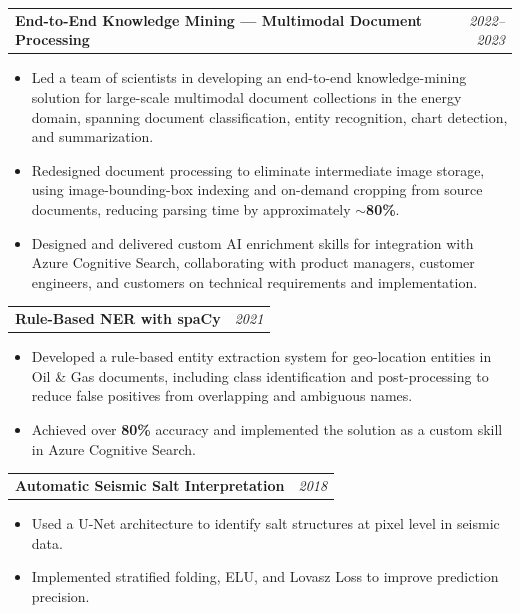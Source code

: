 \documentclass[10pt,letterpaper]{article}
\makeatletter
\newcommand{\heading}[2]{\vspace{2pt}\begin{tabularx}{\textwidth}{@{}Xr@{}}\textbf{#1} & \textit{#2}\end{tabularx}\vspace{-0pt}}
\makeatother
\begin{document}
\heading{End-to-End Knowledge Mining --- Multimodal Document Processing}{2022--2023}
\begin{itemize}
\item Led a team of scientists in developing an end-to-end knowledge-mining solution for large-scale multimodal document collections in the energy domain, spanning document classification, entity recognition, chart detection, and summarization.
\item Redesigned document processing to eliminate intermediate image storage, using image-bounding-box indexing and on-demand cropping from source documents, reducing parsing time by approximately \textbf{$\sim$80\%}.
\item Designed and delivered custom AI enrichment skills for integration with Azure Cognitive Search, collaborating with product managers, customer engineers, and customers on technical requirements and implementation.
\end{itemize}

\heading{Rule-Based NER with spaCy}{2021}
\begin{itemize}
\item Developed a rule-based entity extraction system for geo-location entities in Oil \& Gas documents, including class identification and post-processing to reduce false positives from overlapping and ambiguous names.
\item Achieved over \textbf{80\%} accuracy and implemented the solution as a custom skill in Azure Cognitive Search.
\end{itemize}

\heading{Automatic Seismic Salt Interpretation}{2018}
\begin{itemize}
\item Used a U-Net architecture to identify salt structures at pixel level in seismic data.
\item Implemented stratified folding, ELU, and Lovasz Loss to improve prediction precision.
\end{itemize}
\end{document}
